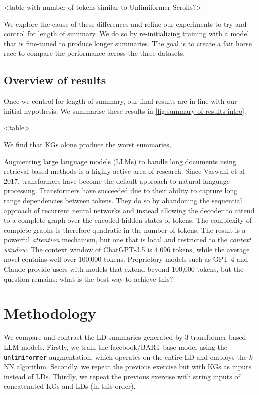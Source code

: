 \documentclass[12pt]{article}
\begin{document}
<table with number of tokens similar to Unlimiformer Scrolls?>

We explore the cause of these differences and refine our experiments to try and
control for length of summary. We do so by re-initializing training with a
model that is fine-tuned to produce longer summaries. The goal is to create a
fair horse race to compare the performance across the three datasets.

\subsection*{Overview of results} Once we control for length of summary, our
final results are in line with our initial hypothesis. We summarise these
results in \ref{fig:summary-of-results-intro}.

<table>

We find that KGs alone
produce the worst summaries, 


Augmenting large language models (LLMs) to handle long documents using
retrieval-based methods is a highly active area of research. Since Vaswani et
al 2017, transformers have become the default approach to natural language
processing. Transformers have succeeded due to their ability to capture long
range dependencies between tokens. They do so by abandoning the sequential
approach of recurrent neural networks and instead allowing the decoder to
attend to a complete graph over the encoded hidden states of tokens. The
complexity of complete graphs is therefore quadratic in the number of tokens.
The result is a powerful \emph{attention} mechanism, but one that is local and
restricted to the \emph{context window}. The context window of ChatGPT-3.5 is
4,096 tokens, while the average novel contains well over 100,000 tokens.
Proprietory models such as GPT-4 and Claude provide users with models that
extend beyond 100,000 tokens, but the question remains: what is the best way to
achieve this?



\section{Methodology}
We compare and contrast the LD summaries generated by 3 transformer-based LLM
models. Firstly, we train the facebook/BART base model using the
\texttt{unlimiformer} augmentation, which operates on the entire LD and employs
the $k$-NN algorithm. Secondly, we repeat the previous exercise but with KGs as
inputs instead of LDs. Thirdly, we repeat the previous exercise with string
inputs of concatenated KGs and LDs (in this order).
\end{document}
